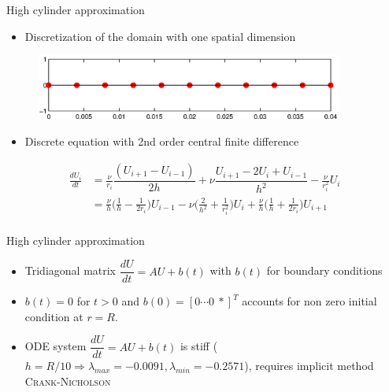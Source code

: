 \documentclass{beamer}
\begin{document}
\begin{frame}{High cylinder approximation}
\begin{itemize}
\item Discretization of the domain with one spatial dimension
\end{itemize}
\begin{figure}[!h]
\centering
\includegraphics[width = 0.9\textwidth]{./axis.eps}
\end{figure}

\begin{itemize}
\item Discrete equation with 2nd order central finite difference
\end{itemize}
\begin{align*}
\frac{dU_i}{dt} &= \frac{\nu}{r_i}\dfrac{(U_{i+1}-U_{i-1})}{2h}+\nu\dfrac{U_{i+1}-2U_{i}+U_{i-1}}{h^{2}} -\frac{\nu}{r_{i}^2}U_{i}\\
&= \frac{\nu}{h}\Big( \frac{1}{h} - \frac{1}{2r_i}\Big)U_{i-1} 
 -\nu\Big( \frac{2}{h^2} + \frac{1}{r_{i}^{2}}\Big)U_{i}
+ \frac{\nu}{h}\Big( \frac{1}{h} + \frac{1}{2r_i}\Big)U_{i+1}\\
\end{align*} 
\end{frame}

\begin{frame}{High cylinder approximation}

\begin{itemize}
\item Tridiagonal matrix $\dfrac{dU}{dt} = AU+b(t)$ with $b(t)$ for boundary conditions
\item $b(t) =0$ for $t>0$ and $b(0)  = [0 \cdots 0  ~*]^{T}$ accounts for non zero initial condition at $r=R$.
\item ODE system $\dfrac{dU}{dt}=AU + b(t)$ is stiff ($h=R/10 \Longrightarrow \lambda_{max} = -0.0091, \lambda_{min}=-0.2571$), requires implicit method \textsc{Crank-Nicholson}
\end{itemize}
\end{frame}
\end{document}
